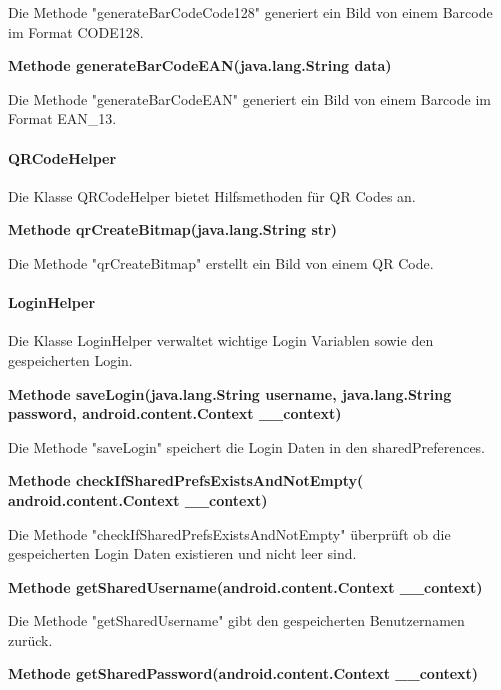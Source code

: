 \documentclass{scrartcl}
\begin{document}
\noindent Die Methode "generateBarCodeCode128" generiert ein Bild von einem Barcode im Format CODE128. \newline 

\noindent\textbf{Methode generateBarCodeEAN(java.lang.String data)}

\noindent Die Methode "generateBarCodeEAN" generiert ein Bild von einem Barcode im Format EAN\_13. \newline 


\paragraph{QRCodeHelper}
Die Klasse QRCodeHelper bietet Hilfsmethoden für QR Codes an. \newline 

\noindent\textbf{Methode qrCreateBitmap(java.lang.String str)}

\noindent Die Methode "qrCreateBitmap" erstellt ein Bild von einem QR Code. \newline 

\paragraph{LoginHelper}
Die Klasse LoginHelper verwaltet wichtige Login Variablen sowie den gespeicherten Login. \newline 

\noindent\textbf{Methode saveLogin(java.lang.String username, \newline                      java.lang.String password, android.content.Context \_\_context)}

\noindent Die Methode "saveLogin" speichert die Login Daten in den sharedPreferences. \newline 

\noindent\textbf{Methode checkIfSharedPrefsExistsAndNotEmpty( \newline android.content.Context \_\_context)}

\noindent Die Methode "checkIfSharedPrefsExistsAndNotEmpty" überprüft ob die gespeicherten Login Daten existieren und nicht leer sind. \newline 

\noindent\textbf{Methode getSharedUsername(android.content.Context \_\_context)}

\noindent Die Methode "getSharedUsername" gibt den gespeicherten Benutzernamen zurück. \newline 

\noindent\textbf{Methode getSharedPassword(android.content.Context \_\_context)}
\end{document}

